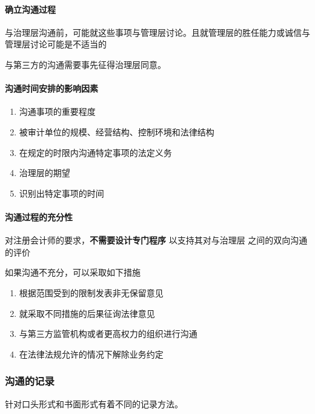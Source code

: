 \documentclass[UTF8,12pt]{ctexart}
\numberwithin{equation}{section} %
\numberwithin{figure}{section}
\numberwithin{table}{section}
\begin{document}
	\paragraph{确立沟通过程}
	与治理层沟通前，可能就这些事项与管理层讨论。且就管理层的胜任能力或诚信与管理层讨论可能是不适当的
	
	与第三方的沟通需要事先征得治理层同意。
	
	\paragraph{沟通时间安排的影响因素}
	\begin{enumerate}
		\item 沟通事项的重要程度
		
		\item 被审计单位的规模、经营结构、控制环境和法律结构   
		
		\item 在规定的时限内沟通特定事项的法定义务
		
		\item 治理层的期望
		
		\item 识别出特定事项的时间
	\end{enumerate}
	
	
	\paragraph{沟通过程的充分性}
	对注册会计师的要求，\textbf{不需要设计专门程序}  以支持其对与治理层 之间的双向沟通的评价
	
	如果沟通不充分，可以采取如下措施
	\begin{enumerate}
		\item 根据范围受到的限制发表非无保留意见
		
		\item 就采取不同措施的后果征询法律意见
		
		\item 与第三方监管机构或者更高权力的组织进行沟通
		
		\item 在法律法规允许的情况下解除业务约定
	\end{enumerate}
	
	
	
	\subsubsection{沟通的记录}
	针对口头形式和书面形式有着不同的记录方法。
	
\end{document}
